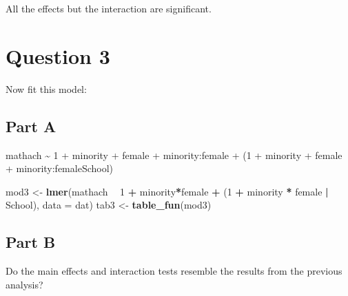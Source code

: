 \documentclass[]{article}
\newenvironment{Shaded}{\begin{snugshade}}{\end{snugshade}}
\newcommand{\KeywordTok}[1]{\textcolor[rgb]{0.13,0.29,0.53}{\textbf{#1}}}
\newcommand{\DataTypeTok}[1]{\textcolor[rgb]{0.13,0.29,0.53}{#1}}
\newcommand{\DecValTok}[1]{\textcolor[rgb]{0.00,0.00,0.81}{#1}}
\newcommand{\StringTok}[1]{\textcolor[rgb]{0.31,0.60,0.02}{#1}}
\newcommand{\OperatorTok}[1]{\textcolor[rgb]{0.81,0.36,0.00}{\textbf{#1}}}
\newcommand{\NormalTok}[1]{#1}
\begin{document}
All the effects but the interaction are significant.

\section{Question 3}\label{question-3}

Now fit this model:

\subsection{Part A}\label{part-a-1}

mathach \textasciitilde{} 1 + minority + female + minority:female + (1 +
minority + female + minority:female\textbar{}School)

\begin{Shaded}
\begin{Highlighting}[]
\NormalTok{mod3 <-}\StringTok{ }\KeywordTok{lmer}\NormalTok{(mathach }\OperatorTok{~}\StringTok{ }\DecValTok{1} \OperatorTok{+}\StringTok{ }\NormalTok{minority}\OperatorTok{*}\NormalTok{female }\OperatorTok{+}\StringTok{ }\NormalTok{(}\DecValTok{1} \OperatorTok{+}\StringTok{ }\NormalTok{minority }\OperatorTok{*}\StringTok{ }\NormalTok{female }\OperatorTok{|}\StringTok{ }\NormalTok{School), }\DataTypeTok{data =}\NormalTok{ dat)}
\NormalTok{tab3 <-}\StringTok{ }\KeywordTok{table_fun}\NormalTok{(mod3)}
\end{Highlighting}
\end{Shaded}

\subsection{Part B}\label{part-b-1}

Do the main effects and interaction tests resemble the results from the
previous analysis?
\end{document}
